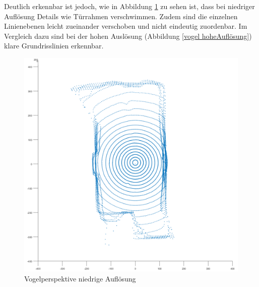 Deutlich erkennbar ist jedoch, wie in Abbildung \ref{vogel niedrigeAuflösung} zu sehen ist, dass bei niedriger Auflösung Details wie Türrahmen verschwimmen. Zudem sind die einzelnen Linienebenen leicht zueinander verschoben und nicht eindeutig zuordenbar.
Im Vergleich dazu sind bei der hohen Auslösung (Abbildung \ref{vogel hoheAuflösung}) klare Grundrisslinien erkennbar.

\begin{figure}[htb]
	\centering
	\begin{minipage}[t]{0.45\linewidth}
		\centering
		\includegraphics[width=1.2\linewidth]{images/Validierung/Aufloesungen/niedrig_vogel.png}
		\caption{Vogelperspektive niedrige Auflösung}
		\label{vogel niedrigeAuflösung}
	\end{minipage}
	\hfill
	\begin{minipage}[t]{0.45\linewidth}
		\centering

\end{minipage}
\end{figure}
